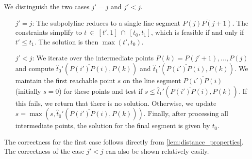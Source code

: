 We distinguish the two cases \(j' = j\) and \(j' < j\).
\begin{enumerate}
	\item[\(j' = j\): ] The subpolyline reduces to a single line segment \(\overline{P(j)P(j+1)}\). The constraints simplify to \newline \(t~\in~[t',1]~\cap~[t_0,t_1]\), which is feasible if and only if \(t' \leq t_1\). The solution is then \(\max(t', t_0)\).

	\item[\(j' < j\): ] We iterate over the intermediate points \(P(k) = P(j'+1), \dots, P(j)\) and compute \(\hat t_0'(\overline{P(i')P(i)}, P(k))\) and \(\hat t_1'(\overline{P(i')P(i)}, P(k))\). We maintain the first reachable point \(s\) on the line segment \(\overline{P(i')P(i)}\) (initially \(s = 0\)) for these points and test if \(s \leq \hat t_1'(\overline{P(i')P(i)}, P(k))\). If this fails, we return that there is no solution. Otherwise, we update \(s = \max(s, \hat t_0'(\overline{P(i')P(i)}, P(k)))\). Finally, after processing all intermediate points, the solution for the final segment is given by \(t_0\).
\end{enumerate}

The correctness for the first case follows directly from \cref{lem:distance_properties}. The correctness of the case \(j' < j\) can also be shown relatively easily.

